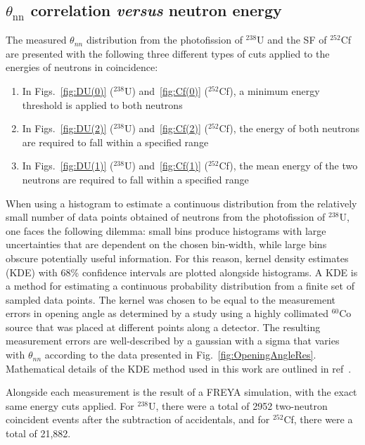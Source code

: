 \subsection{$\theta_{\text{nn}}$ correlation \emph{versus} neutron energy}
The measured $\theta_{nn}$ distribution from the photofission of $^{238}$U and the SF of $^{252}$Cf are presented with the following three different types of cuts applied to the energies of neutrons in coincidence:
\begin{enumerate}[label=(\roman*), itemjoin={{, }}, itemjoin*={{, or }}]
    \item In Figs.~\ref{fig:DU(0)} ($^{238}$U) and~\ref{fig:Cf(0)} ($^{252}$Cf), a minimum energy threshold is applied to both neutrons
    \item In Figs.~\ref{fig:DU(2)} ($^{238}$U) and~\ref{fig:Cf(2)} ($^{252}$Cf), the energy of both neutrons are required to fall within a specified range
  \item In Figs.~\ref{fig:DU(1)} ($^{238}$U) and~\ref{fig:Cf(1)} ($^{252}$Cf), the mean energy of the two neutrons are required to fall within a specified range
 \end{enumerate}

When using a histogram to estimate a continuous distribution from the relatively small number of data points obtained of neutrons from the photofission of $^{238}$U, one faces the following dilemma: small bins produce histograms with large uncertainties that are dependent on the chosen bin-width, while large bins obscure potentially useful information. 
For this reason, kernel density estimates (KDE) with 68\% confidence intervals are plotted alongside histograms.
A KDE is a method for estimating a continuous probability distribution from a finite set of sampled data points.
The kernel was chosen to be equal to the measurement errors in opening angle as determined by a study using a highly collimated $^{60}$Co source that was placed at different points along a detector.
The resulting measurement errors are well-described by a gaussian with a sigma that varies with $\theta_{nn}$ according to the data presented in Fig.~\ref{fig:OpeningAngleRes}.
Mathematical details of the KDE method used in this work are outlined in ref~\cite{KDE}. 

Alongside each measurement is the result of a FREYA simulation, with the exact same energy cuts applied.
For $^{238}$U, there were a total of 2952 two-neutron coincident events after the subtraction of accidentals, and for $^{252}$Cf, there were a total of 21,882.

